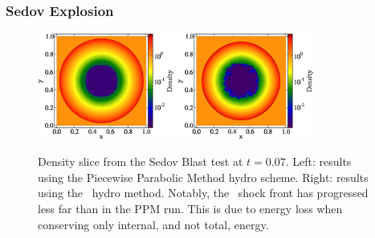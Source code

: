 \subsubsection{Sedov Explosion}
\label{sec.tests.sedov}

\begin{figure}
\begin{center}
\includegraphics[width=0.4\textwidth]{figures/sedov-ppm-slice.eps}
\includegraphics[width=0.4\textwidth]{figures/sedov-zeus-slice.eps}
\caption{Density slice from the Sedov Blast test at $t = 0.07$. Left:
results using the Piecewise Parabolic Method hydro scheme.  Right: results using the \zeus\
hydro method. Notably, the \zeus\ shock front has progressed less far
than in the PPM run. This is due to energy loss when conserving only
internal, and not total, energy.}
\label{fig.sedov1}
\end{center}
\end{figure}


